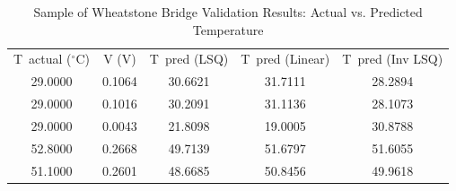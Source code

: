 \begin{table}[H]
\centering
\caption{Sample of Wheatstone Bridge Validation Results: Actual vs. Predicted Temperature}
\label{table:validation_comparison_sample}
\begin{tabular}{ccccc}

T\ actual ($^{\circ}$C) &  V (V) & T\ pred (LSQ) & T\ pred (Linear) & T\ pred (Inv LSQ) \\

                29.0000 & 0.1064 &       30.6621 &          31.7111 &           28.2894 \\
                29.0000 & 0.1016 &       30.2091 &          31.1136 &           28.1073 \\
                29.0000 & 0.0043 &       21.8098 &          19.0005 &           30.8788 \\
                52.8000 & 0.2668 &       49.7139 &          51.6797 &           51.6055 \\
                51.1000 & 0.2601 &       48.6685 &          50.8456 &           49.9618 \\

\end{tabular}
\end{table}
